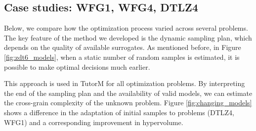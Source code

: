     \subsection*{Case studies: WFG1, WFG4, DTLZ4}
    Below, we compare how the optimization process varied across several problems.
    The key feature of the method we developed is the dynamic sampling plan, which depends on the quality of available surrogates. 
    As mentioned before, in Figure \ref{fig:zdt6_models}, when a static number of random samples is estimated, it is possible to make optimal decisions much earlier.         
    
    This approach is used in TutorM for all optimization problems. By interpreting the end of the sampling plan and the availability of valid models, we can estimate the cross-grain complexity of the unknown problem. Figure \ref{fig:changing_models} shows a difference in the adaptation of initial samples to problems (DTLZ4, WFG1) and a corresponding improvement in hypervolume. 
    

